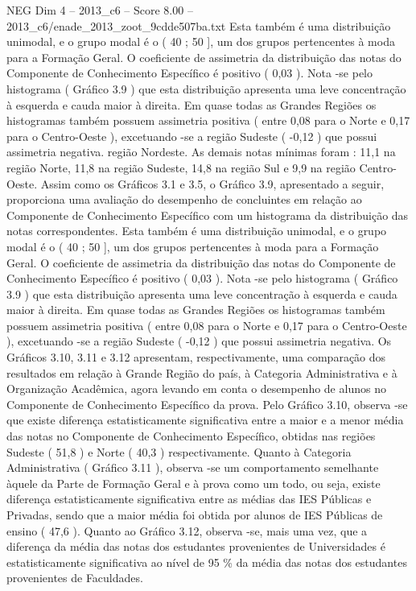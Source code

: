 \begin{textsample}{NEG Dim 4 – 2013\_c6 – Score 8.00 – 2013\_c6/enade\_2013\_zoot\_9cdde507ba.txt}
Esta também é uma distribuição unimodal, e o grupo modal é o ( 40 ; 50 ], um dos grupos pertencentes à moda para a Formação Geral.
O coeficiente de assimetria da distribuição das notas do Componente de Conhecimento Específico é positivo ( 0,03 ).
Nota -se pelo histograma ( Gráfico 3.9 ) que esta distribuição apresenta uma leve concentração à esquerda e cauda maior à direita.
Em quase todas as Grandes Regiões os histogramas também possuem assimetria positiva ( entre 0,08 para o Norte e 0,17 para o Centro-Oeste ), excetuando -se a região Sudeste ( -0,12 ) que possui assimetria negativa. região Nordeste.
As demais notas mínimas foram : 11,1 na região Norte, 11,8 na região Sudeste, 14,8 na região Sul e 9,9 na região Centro-Oeste.
Assim como os Gráficos 3.1 e 3.5, o Gráfico 3.9, apresentado a seguir, proporciona uma avaliação do desempenho de concluintes em relação ao Componente de Conhecimento Específico com um histograma da distribuição das notas correspondentes.
Esta também é uma distribuição unimodal, e o grupo modal é o ( 40 ; 50 ], um dos grupos pertencentes à moda para a Formação Geral.
O coeficiente de assimetria da distribuição das notas do Componente de Conhecimento Específico é positivo ( 0,03 ).
Nota -se pelo histograma ( Gráfico 3.9 ) que esta distribuição apresenta uma leve concentração à esquerda e cauda maior à direita.
Em quase todas as Grandes Regiões os histogramas também possuem assimetria positiva ( entre 0,08 para o Norte e 0,17 para o Centro-Oeste ), excetuando -se a região Sudeste ( -0,12 ) que possui assimetria negativa.
Os Gráficos 3.10, 3.11 e 3.12 apresentam, respectivamente, uma comparação dos resultados em relação à Grande Região do país, à Categoria Administrativa e à Organização Acadêmica, agora levando em conta o desempenho de alunos no Componente de Conhecimento Específico da prova.
Pelo Gráfico 3.10, observa -se que existe diferença estatisticamente significativa entre a maior e a menor média das notas no Componente de Conhecimento Específico, obtidas nas regiões Sudeste ( 51,8 ) e Norte ( 40,3 ) respectivamente.
Quanto à Categoria Administrativa ( Gráfico 3.11 ), observa -se um comportamento semelhante àquele da Parte de Formação Geral e à prova como um todo, ou seja, existe diferença estatisticamente significativa entre as médias das IES Públicas e Privadas, sendo que a maior média foi obtida por alunos de IES Públicas de ensino ( 47,6 ).
Quanto ao Gráfico 3.12, observa -se, mais uma vez, que a diferença da média das notas dos estudantes provenientes de Universidades é estatisticamente significativa ao nível de 95 \% da média das notas dos estudantes provenientes de Faculdades.

\end{textsample}
